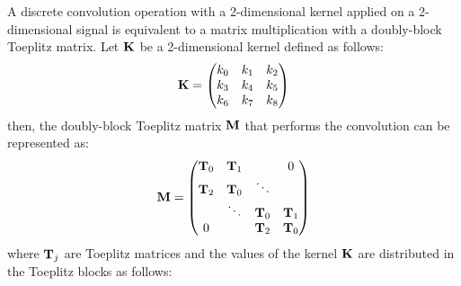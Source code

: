 A discrete convolution operation with a 2-dimensional kernel applied on a 2-dimensional signal is equivalent to a matrix multiplication with a doubly-block Toeplitz matrix.
Let $\mathbf{K}$ be a 2-dimensional kernel defined as follows:
\begin{equation*}
  \mathbf{K} = \begin{pmatrix}
    k_0 & k_1 & k_2 \\
    k_3 & k_4 & k_5 \\
    k_6 & k_7 & k_8 
  \end{pmatrix}
\end{equation*}
then, the doubly-block Toeplitz matrix $\mathbf{M}$ that performs the convolution can be represented as:
\begin{equation*}
  \mathbf{M} = \begin{pmatrix}
    \mathbf{T}_0 & \mathbf{T}_1 &         &  0       \\
    \mathbf{T}_2 & \mathbf{T}_0 & \ddots  &          \\
            & \ddots  & \mathbf{T}_0 & \mathbf{T}_1  \\
    0       &         & \mathbf{T}_2 &  \mathbf{T}_0
  \end{pmatrix}
\end{equation*}
where $\mathbf{T}_j$ are Toeplitz matrices and the values of the kernel $\mathbf{K}$ are distributed in the Toeplitz blocks as follows:
